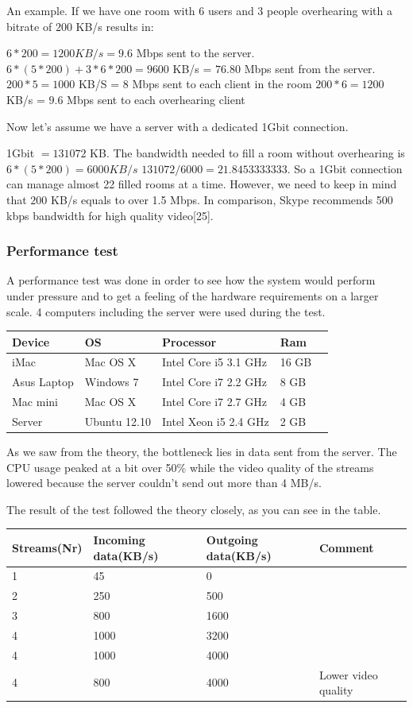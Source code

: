 \documentclass[12pt, titlepage]{article}
\begin{document}
An example. If we have one room with 6 users and 3 people overhearing with a bitrate of $200$ KB/s results in:

$6*200 = 1 200 KB/s = 9.6$ Mbps sent to the server.
$6*(5*200) + 3*6*200 = 9 600$ KB/s = $76.80$ Mbps sent from the server.
$200*5 = 1000$ KB/S  = $8$ Mbps sent to each client in the room
$200*6 = 1200$ KB/s = $9.6$ Mbps sent to each overhearing client

Now let’s assume we have a server with a dedicated 1Gbit connection.

1Gbit $= 131 072$ KB.
The bandwidth needed to fill a room without overhearing is $6*(5*200) = 6 000 KB/s$
$131 072/6 000 = 21.8453333333$. So a 1Gbit connection can manage almost 22 filled rooms at a time. However, we need to keep in mind that $200$ KB/s equals to over 1.5 Mbps. In comparison, Skype recommends 500 kbps bandwidth for high quality video[25].
\subsubsection{Performance test}

A performance test was done in order to see how the system would perform under pressure and to get a feeling of the hardware requirements on a larger scale. 4 computers including the server were used during the test.
\begin{center}
    \begin{tabular}{| l | l | l | l | l |}
    \hline
    Device & OS & Processor & Ram \\ \hline
    iMac & Mac OS X & Intel Core i5 3.1 GHz & 16 GB\\ \hline
    Asus Laptop & Windows 7 & Intel Core i7 2.2 GHz & 8 GB \\ \hline
    Mac mini & Mac OS X & Intel Core i7 2.7 GHz & 4 GB \\ \hline
    Server & Ubuntu 12.10 & Intel Xeon i5 2.4 GHz & 2 GB\\ \hline
    \end{tabular}
\end{center}
As we saw from the theory, the bottleneck lies in data sent from the server. The CPU usage peaked at a bit over 50\% while the video quality of the streams lowered because the server couldn't send out more than 4 MB/s.

The result of the test followed the theory closely, as you can see in the table.

\begin{center}
    \begin{tabular}{| l | l | l | l |}
    \hline
    Streams(Nr) & Incoming data(KB/s) & Outgoing data(KB/s) & Comment \\ \hline
    1 & 45 & 0 & \\ \hline
    2 & 250 & 500 & \\ \hline
    3 & 800 & 1600 & \\ \hline
    4 & 1000 & 3200 &\\ \hline
    4 & 1000 & 4000 &\\ \hline
    4 & 800 & 4000 & Lower video quality\\ \hline
    \end{tabular}
\end{center}
\end{document}
